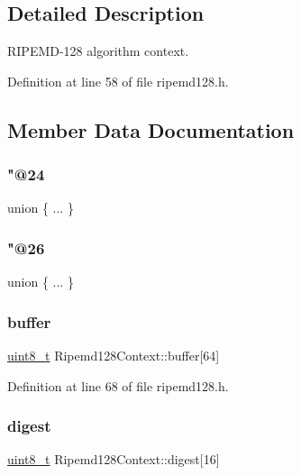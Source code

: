 \subsection{Detailed Description}
R\+I\+P\+E\+M\+D-\/128 algorithm context. 

Definition at line 58 of file ripemd128.\+h.



\subsection{Member Data Documentation}
\mbox{\label{structRipemd128Context_a3ceea0c4ce99b43080dc073f184208b5}} 
\subsubsection{\texorpdfstring{"@24}{@24}}
{\footnotesize\ttfamily union \{ ... \} }

\mbox{\label{structRipemd128Context_a48ad4ee96b4c0f578efea1ff08ddce17}} 
\subsubsection{\texorpdfstring{"@26}{@26}}
{\footnotesize\ttfamily union \{ ... \} }

\mbox{\label{structRipemd128Context_a8774c12459fe6591351e4e9c25841cc6}} 
\subsubsection{\texorpdfstring{buffer}{buffer}}
{\footnotesize\ttfamily \hyperlink{stdint_8h_aba7bc1797add20fe3efdf37ced1182c5}{uint8\+\_\+t} Ripemd128\+Context\+::buffer\mbox{[}64\mbox{]}}



Definition at line 68 of file ripemd128.\+h.

\mbox{\label{structRipemd128Context_ad4489484e8873cd94cd7989ad375bb6e}} 
\subsubsection{\texorpdfstring{digest}{digest}}
{\footnotesize\ttfamily \hyperlink{stdint_8h_aba7bc1797add20fe3efdf37ced1182c5}{uint8\+\_\+t} Ripemd128\+Context\+::digest\mbox{[}16\mbox{]}}



